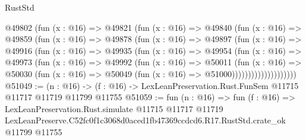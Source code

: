 \begin{lexlean}{RustStd}
\begin{coremodule}
              @49802
                (fun (x : @16) =>
                @49821
                  (fun (x : @16) =>
                  @49840
                    (fun (x : @16) =>
                    @49859
                      (fun (x : @16) =>
                      @49878
                        (fun (x : @16) =>
                        @49897
                          (fun (x : @16) =>
                          @49916
                            (fun (x : @16) =>
                            @49935
                              (fun (x : @16) =>
                              @49954
                                (fun (x : @16) =>
                                @49973
                                  (fun (x : @16) =>
                                  @49992
                                    (fun (x : @16) =>
                                    @50011
                                      (fun (x : @16) =>
                                      @50030
                                        (fun (x : @16) =>
                                        @50049 (fun (x : @16) => @51000))))))))))))))))))))
@51049 := (n : @16) ->
  (f : @16) -> LexLeanPreservation.Rust.FunSem @11715 @11717 @11719 @11799 @11755
@51059 := fun (n : @16) =>
  fun (f : @16) =>
  LexLeanPreservation.Rust.simulate
    @11715
    @11717
    @11719
    LexLeanPreserve.C52fc0f1c3068d0aced1fb47369ccdcd6.R17.RustStd.crate_ok
    @11799
    @11755
\end{coremodule}
\end{lexlean}
